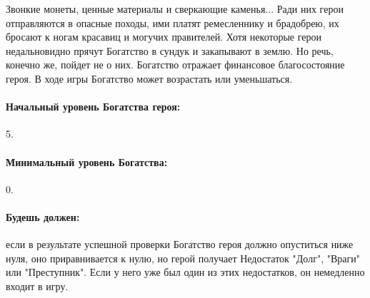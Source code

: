 Звонкие монеты, ценные материалы и сверкающие каменья... Ради них герои отправляются в опасные походы, ими платят ремесленнику и брадобрею, их бросают к ногам красавиц и могучих правителей. Хотя некоторые герои недальновидно прячут Богатство в сундук и закапывают в землю. Но речь, конечно же, пойдет не о них.
\newline Богатство отражает финансовое благосостояние героя. В ходе игры Богатство может возрастать или уменьшаться.
\paragraph{Начальный уровень Богатства героя:} 5.
\paragraph{Минимальный уровень Богатства:} 0.
\paragraph{Будешь должен:} если в результате успешной проверки Богатство героя должно опуститься ниже нуля, оно приравнивается к нулю, но герой получает Недостаток "Долг", "Враги" или "Преступник". Если у него уже был один из этих недостатков, он немедленно входит в игру.
